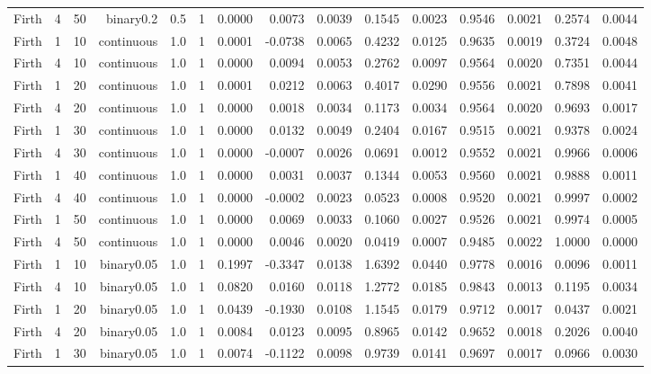 \begin{longtable}{rrrrrrrrrrrrrrr}
  Firth & 4 & 50 & binary0.2 & 0.5 & 1 & 0.0000 & 0.0073 & 0.0039 & 0.1545 & 0.0023 & 0.9546 & 0.0021 & 0.2574 & 0.0044 \\ 
  Firth & 1 & 10 & continuous & 1.0 & 1 & 0.0001 & -0.0738 & 0.0065 & 0.4232 & 0.0125 & 0.9635 & 0.0019 & 0.3724 & 0.0048 \\ 
  Firth & 4 & 10 & continuous & 1.0 & 1 & 0.0000 & 0.0094 & 0.0053 & 0.2762 & 0.0097 & 0.9564 & 0.0020 & 0.7351 & 0.0044 \\ 
  Firth & 1 & 20 & continuous & 1.0 & 1 & 0.0001 & 0.0212 & 0.0063 & 0.4017 & 0.0290 & 0.9556 & 0.0021 & 0.7898 & 0.0041 \\ 
  Firth & 4 & 20 & continuous & 1.0 & 1 & 0.0000 & 0.0018 & 0.0034 & 0.1173 & 0.0034 & 0.9564 & 0.0020 & 0.9693 & 0.0017 \\ 
  Firth & 1 & 30 & continuous & 1.0 & 1 & 0.0000 & 0.0132 & 0.0049 & 0.2404 & 0.0167 & 0.9515 & 0.0021 & 0.9378 & 0.0024 \\ 
  Firth & 4 & 30 & continuous & 1.0 & 1 & 0.0000 & -0.0007 & 0.0026 & 0.0691 & 0.0012 & 0.9552 & 0.0021 & 0.9966 & 0.0006 \\ 
  Firth & 1 & 40 & continuous & 1.0 & 1 & 0.0000 & 0.0031 & 0.0037 & 0.1344 & 0.0053 & 0.9560 & 0.0021 & 0.9888 & 0.0011 \\ 
  Firth & 4 & 40 & continuous & 1.0 & 1 & 0.0000 & -0.0002 & 0.0023 & 0.0523 & 0.0008 & 0.9520 & 0.0021 & 0.9997 & 0.0002 \\ 
  Firth & 1 & 50 & continuous & 1.0 & 1 & 0.0000 & 0.0069 & 0.0033 & 0.1060 & 0.0027 & 0.9526 & 0.0021 & 0.9974 & 0.0005 \\ 
  Firth & 4 & 50 & continuous & 1.0 & 1 & 0.0000 & 0.0046 & 0.0020 & 0.0419 & 0.0007 & 0.9485 & 0.0022 & 1.0000 & 0.0000 \\ 
  Firth & 1 & 10 & binary0.05 & 1.0 & 1 & 0.1997 & -0.3347 & 0.0138 & 1.6392 & 0.0440 & 0.9778 & 0.0016 & 0.0096 & 0.0011 \\ 
  Firth & 4 & 10 & binary0.05 & 1.0 & 1 & 0.0820 & 0.0160 & 0.0118 & 1.2772 & 0.0185 & 0.9843 & 0.0013 & 0.1195 & 0.0034 \\ 
  Firth & 1 & 20 & binary0.05 & 1.0 & 1 & 0.0439 & -0.1930 & 0.0108 & 1.1545 & 0.0179 & 0.9712 & 0.0017 & 0.0437 & 0.0021 \\ 
  Firth & 4 & 20 & binary0.05 & 1.0 & 1 & 0.0084 & 0.0123 & 0.0095 & 0.8965 & 0.0142 & 0.9652 & 0.0018 & 0.2026 & 0.0040 \\ 
  Firth & 1 & 30 & binary0.05 & 1.0 & 1 & 0.0074 & -0.1122 & 0.0098 & 0.9739 & 0.0141 & 0.9697 & 0.0017 & 0.0966 & 0.0030 \\ 

\end{longtable}
